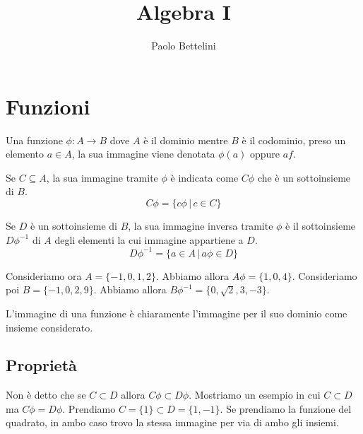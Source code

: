 \documentclass[a4paper]{article}
\title{Algebra I}
\author{Paolo Bettelini}
\date{}
\begin{document}
\maketitle
\tableofcontents

\section{Funzioni}

Una funzione \(\phi\colon A \to B\) dove \(A\) è il dominio mentre \(B\) è il codominio,
preso un elemento \(a\in A\), la sua immagine viene denotata \(\phi(a)\) oppure \(af\).

Se \(C \subseteq A\), la sua immagine tramite \(\phi\) è indicata come \(C\phi\)
che è un sottoinsieme di \(B\).
\[
    C\phi = \{  c\phi \,|\, c\in C \}
\]

Se \(D\) è un sottoinsieme di \(B\), la sua immagine inversa tramite \(\phi\)
è il sottoinsieme \(D\phi^{-1}\) di \(A\) degli elementi la cui immagine appartiene a \(D\).
\[
    D\phi^{-1} = \{  a \in A \,|\, a\phi \in D \}
\]


Consideriamo ora \(A=\{-1,0,1,2\}\). Abbiamo allora \(A\phi = \{1,0,4\}\).
Consideriamo poi \(B=\{-1, 0, 2, 9\}\). Abbiamo allora \(B\phi^{-1} = \{0, \sqrt{2}, 3, -3\}\).

L'immagine di una funzione è chiaramente l'immagine per il suo dominio come insieme considerato.

\subsection{Proprietà}



Non è detto che se \(C \subset D\) allora \(C\phi \subset D\phi\).
Mostriamo un esempio in cui \(C \subset D\) ma \(C\phi = D\phi\).
Prendiamo \(C=\{1\} \subset D=\{1,-1\}\). Se prendiamo la funzione del quadrato, in ambo caso
trovo la stessa immagine per via di ambo gli insiemi.
\end{document}
